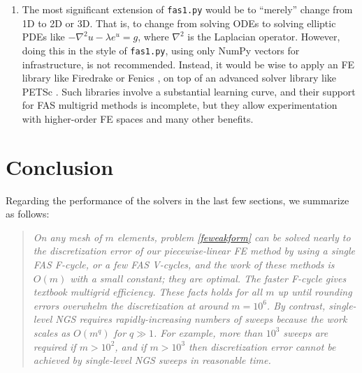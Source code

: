 \documentclass[letterpaper,final,12pt,reqno]{amsart}
\newcommand{\grad}{\nabla}
\begin{document}
\begin{enumerate}
\item The most significant extension of \texttt{fas1.py} would be to ``merely'' change from 1D to 2D or 3D.  That is, to change from solving ODEs to solving elliptic PDEs like $-\grad^2 u - \lambda e^u=g$, where $\grad^2$ is the Laplacian operator.  However, doing this in the style of \texttt{fas1.py}, using only NumPy vectors for infrastructure, is not recommended.  Instead, it would be wise to apply an FE library like Firedrake \cite{Rathgeberetal2016} or Fenics \cite{Loggetal2012}, on top of an advanced solver library like PETSc \cite{Balayetal2021,Bueler2021}.  Such libraries involve a substantial learning curve, and their support for FAS multigrid methods is incomplete, but they allow experimentation with higher-order FE spaces and many other benefits.
\end{enumerate}


\section{Conclusion}  \label{sec:conclusion}

Regarding the performance of the solvers in the last few sections, we summarize as follows:

\begin{quotation}
\emph{On any mesh of $m$ elements, problem \eqref{feweakform} can be solved nearly to the discretization error of our piecewise-linear FE method by using a single FAS F-cycle, or a few FAS V-cycles, and the work of these methods is $O(m)$ with a small constant; they are optimal.  The faster F-cycle gives textbook multigrid efficiency.  These facts holds for all $m$ up until rounding errors overwhelm the discretization at around $m=10^6$.  By contrast, single-level NGS requires rapidly-increasing numbers of sweeps because the work scales as $O(m^q)$ for $q\gg 1$.  For example, more than $10^3$ sweeps are required if $m>10^2$, and if $m>10^3$ then discretization error cannot be achieved by single-level NGS sweeps in reasonable time.}
\end{quotation}

\small

\bigskip


\end{document}
